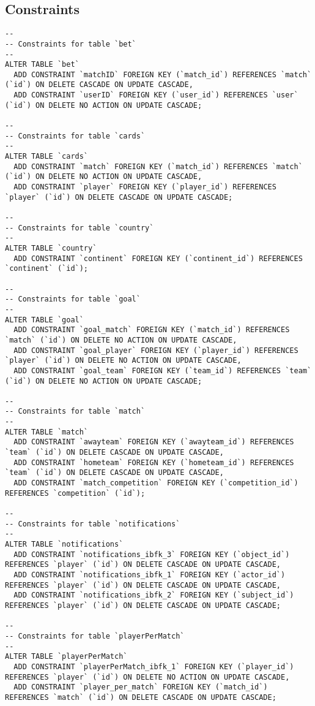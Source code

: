 \documentclass[11pt, a4paper]{article}
\begin{document}
\subsection{Constraints}
\begin{lstlisting}
--
-- Constraints for table `bet`
--
ALTER TABLE `bet`
  ADD CONSTRAINT `matchID` FOREIGN KEY (`match_id`) REFERENCES `match` (`id`) ON DELETE CASCADE ON UPDATE CASCADE,
  ADD CONSTRAINT `userID` FOREIGN KEY (`user_id`) REFERENCES `user` (`id`) ON DELETE NO ACTION ON UPDATE CASCADE;

--
-- Constraints for table `cards`
--
ALTER TABLE `cards`
  ADD CONSTRAINT `match` FOREIGN KEY (`match_id`) REFERENCES `match` (`id`) ON DELETE NO ACTION ON UPDATE CASCADE,
  ADD CONSTRAINT `player` FOREIGN KEY (`player_id`) REFERENCES `player` (`id`) ON DELETE CASCADE ON UPDATE CASCADE;

--
-- Constraints for table `country`
--
ALTER TABLE `country`
  ADD CONSTRAINT `continent` FOREIGN KEY (`continent_id`) REFERENCES `continent` (`id`);

--
-- Constraints for table `goal`
--
ALTER TABLE `goal`
  ADD CONSTRAINT `goal_match` FOREIGN KEY (`match_id`) REFERENCES `match` (`id`) ON DELETE NO ACTION ON UPDATE CASCADE,
  ADD CONSTRAINT `goal_player` FOREIGN KEY (`player_id`) REFERENCES `player` (`id`) ON DELETE NO ACTION ON UPDATE CASCADE,
  ADD CONSTRAINT `goal_team` FOREIGN KEY (`team_id`) REFERENCES `team` (`id`) ON DELETE NO ACTION ON UPDATE CASCADE;

--
-- Constraints for table `match`
--
ALTER TABLE `match`
  ADD CONSTRAINT `awayteam` FOREIGN KEY (`awayteam_id`) REFERENCES `team` (`id`) ON DELETE CASCADE ON UPDATE CASCADE,
  ADD CONSTRAINT `hometeam` FOREIGN KEY (`hometeam_id`) REFERENCES `team` (`id`) ON DELETE CASCADE ON UPDATE CASCADE,
  ADD CONSTRAINT `match_competition` FOREIGN KEY (`competition_id`) REFERENCES `competition` (`id`);

--
-- Constraints for table `notifications`
--
ALTER TABLE `notifications`
  ADD CONSTRAINT `notifications_ibfk_3` FOREIGN KEY (`object_id`) REFERENCES `player` (`id`) ON DELETE CASCADE ON UPDATE CASCADE,
  ADD CONSTRAINT `notifications_ibfk_1` FOREIGN KEY (`actor_id`) REFERENCES `player` (`id`) ON DELETE CASCADE ON UPDATE CASCADE,
  ADD CONSTRAINT `notifications_ibfk_2` FOREIGN KEY (`subject_id`) REFERENCES `player` (`id`) ON DELETE CASCADE ON UPDATE CASCADE;

--
-- Constraints for table `playerPerMatch`
--
ALTER TABLE `playerPerMatch`
  ADD CONSTRAINT `playerPerMatch_ibfk_1` FOREIGN KEY (`player_id`) REFERENCES `player` (`id`) ON DELETE NO ACTION ON UPDATE CASCADE,
  ADD CONSTRAINT `player_per_match` FOREIGN KEY (`match_id`) REFERENCES `match` (`id`) ON DELETE CASCADE ON UPDATE CASCADE;


\end{lstlisting}
\end{document}
